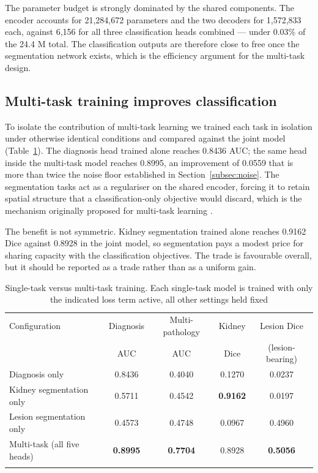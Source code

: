 \documentclass[pdflatex,sn-mathphys-num]{sn-jnl}
\theoremstyle{thmstyleone}%
\theoremstyle{thmstyletwo}%
\theoremstyle{thmstylethree}%
\begin{document}
The parameter budget is strongly dominated by the shared components. The encoder accounts for
21,284,672 parameters and the two decoders for 1,572,833 each, against 6,156 for all three
classification heads combined --- under 0.03\% of the 24.4 M total. The classification outputs
are therefore close to free once the segmentation network exists, which is the efficiency
argument for the multi-task design.

\subsection{Multi-task training improves classification}\label{subsec:multitask}

To isolate the contribution of multi-task learning we trained each task in isolation under
otherwise identical conditions and compared against the joint model
(Table~\ref{tab:singletask}). The diagnosis head trained alone reaches 0.8436 AUC; the same head
inside the multi-task model reaches 0.8995, an improvement of 0.0559 that is more than twice the
noise floor established in Section~\ref{subsec:noise}. The segmentation tasks act as a
regulariser on the shared encoder, forcing it to retain spatial structure that a
classification-only objective would discard, which is the mechanism originally proposed for
multi-task learning \cite{bib_caruana}.

The benefit is not symmetric. Kidney segmentation trained alone reaches 0.9162 Dice against
0.8928 in the joint model, so segmentation pays a modest price for sharing capacity with the
classification objectives. The trade is favourable overall, but it should be reported as a trade
rather than as a uniform gain.

\begin{table}[h]
\caption{Single-task versus multi-task training. Each single-task model is trained with only the
indicated loss term active, all other settings held fixed}\label{tab:singletask}%
\begin{tabular*}{\textwidth}{@{\extracolsep\fill}lcccc}
\toprule
Configuration & Diagnosis & Multi-pathology & Kidney & Lesion Dice \\
              & AUC       & AUC             & Dice   & (lesion-bearing) \\
\midrule
Diagnosis only              & 0.8436 & 0.4040 & 0.1270 & 0.0237 \\
Kidney segmentation only    & 0.5711 & 0.4542 & \textbf{0.9162} & 0.0197 \\
Lesion segmentation only    & 0.4573 & 0.4748 & 0.0967 & 0.4960 \\
\midrule
Multi-task (all five heads) & \textbf{0.8995} & \textbf{0.7704} & 0.8928 & \textbf{0.5056} \\
\botrule
\end{tabular*}
\end{table}
\end{document}
